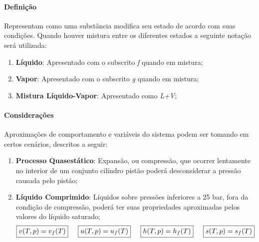 \documentclass{article}
\begin{document}
        \paragraph{Definição}Representam como uma substância modifica seu estado de acordo com suas condições. Quando houver mistura entre os diferentes estados a seguinte notação será utilizada:
            \begin{enumerate}[noitemsep]
                \item \textbf{Líquido}: Apresentado com o subscrito \textit{f} quando em mistura;
                \item \textbf{Vapor}: Apresentado com o subscrito \textit{g} quando em mistura;
                \item \textbf{Mistura Líquido-Vapor}: Apresentado como \textit{L+V};
            \end{enumerate}

        \paragraph{Considerações}Aproximações de comportamento e variáveis do sistema podem ser tomando em certos cenários, descritos a seguir:
            \begin{enumerate}[noitemsep]
                \item \textbf{Processo Quasestático}: Expansão, ou compressão, que ocorrer lentamente no interior de um conjunto cilíndro pistão poderá desconsiderar a pressão causada pelo pistão;
                \item \textbf{Líquido Comprimido}: Líquidos sobre pressões inferiores a 25 bar, fora da condição de compressão, poderá ter suas propriedades aproximadas pelos valores do líquido saturado;
                    \[
                        \boxed{v(T, p) = v_{f}(T)} \hspace{5mm}
                        \boxed{u(T, p) = u_{f}(T)} \hspace{5mm}
                        \boxed{h(T, p) = h_{f}(T)} \hspace{5mm}
                        \boxed{s(T, p) = s_{f}(T)}
                    \]
            \end{enumerate}
\end{document}
